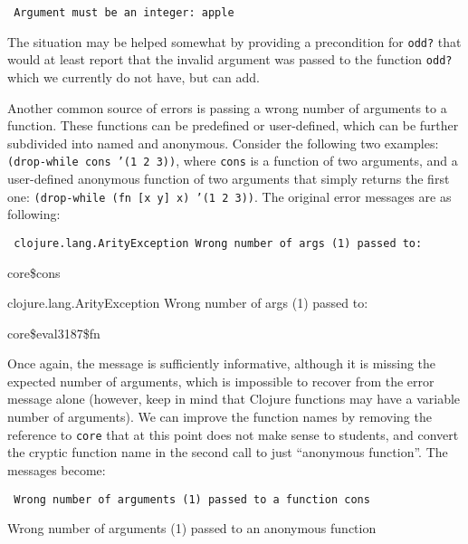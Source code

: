 \documentclass[submission,copyright,creativecommons]{eptcs}
\newcommand{\allcomments}[1]{{#1}}
\newcommand{\elenacomment}[1]{{\bf \textcolor{ForestGreen}{\allcomments{{#1}}}}}
\newcommand{\clocode}[1]{{\tt {#1}}}
\begin{document}
{\tt
Argument must be an integer: apple
}

\noindent 
The situation may be helped somewhat by providing a precondition for \clocode{odd?} that would at least report that the invalid argument was passed to the function \clocode{odd?} which we currently do not have, but can add. 

Another common source of  errors is passing a wrong number of arguments to a function. These functions can be predefined or user-defined, which can be further subdivided into named and anonymous. Consider the following two examples: \clocode{(drop-while cons '(1 2 3))}, where \clocode{cons} is a function of two arguments, and a user-defined anonymous function of two arguments that simply returns the first one: \clocode{(drop-while (fn [x y] x) '(1 2 3))}. The original error messages are as following:

{\tt
clojure.lang.ArityException Wrong number of args (1) passed to: 

core\$cons

clojure.lang.ArityException  Wrong number of args (1) passed to: 

core\$eval3187\$fn
}

\noindent
Once again, the message is sufficiently informative, although it is missing the expected number of arguments, which is impossible to recover from the error message alone (however, keep in mind that Clojure functions may have a variable number of arguments).  We can improve the function names by removing the reference to {\tt core} that at this point does not make sense to students, and convert the cryptic function name in the second call to just ``anonymous function''. The messages become:

{\tt
Wrong number of arguments (1)  passed to a function cons

Wrong number of arguments (1)  passed to an anonymous function
}




%
%
%
\end{document}
